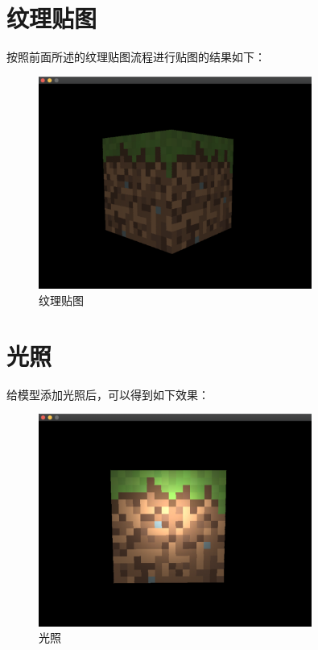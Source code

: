     \section{纹理贴图}
    按照前面所述的纹理贴图流程进行贴图的结果如下：
        \begin{figure}[H]
    	\centering
		\includegraphics[width=0.8\textwidth]{images/demo6.png}
		\caption{纹理贴图}
		\label{demo6}
    \end{figure} 
    
    \section{光照}
    给模型添加光照后，可以得到如下效果：
        \begin{figure}[H]
    	\centering
		\includegraphics[width=0.8\textwidth]{images/demo7.png}
		\caption{光照}
		\label{demo7}
    \end{figure} 
    
